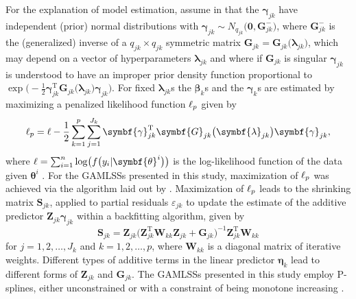 For the explanation of model estimation, assume in  that the \(\symbf{\gamma}_{j k}\) have independent (prior) normal distributions with \(\symbf{\gamma}_{j k} \sim N_{q_{j k}}\bigl(\symbf{0}, \symbf{G}_{j k}^-\bigr)\), where \(\symbf{G}_{j k}^-\) is the (generalized) inverse of a \(q_{j k} \times q_{j k}\) symmetric matrix \(\symbf{G}_{j k} = \symbf{G}_{j k}\bigl(\symbf{\lambda}_{j k}\bigr)\), which may depend on a vector of hyperparameters \(\symbf{\lambda}_{j k}\) and where if \(\symbf{G}_{j k}\) is singular \(\symbf{\gamma}_{j k}\) is understood to have an improper prior density function proportional to \(\exp\bigl(-\frac{1}{2} \symbf{\gamma}_{j k}^{\text{T}} \symbf{G}_{j k}\bigl(\symbf{\lambda}_{j k}\bigr) \symbf{\gamma}_{j k}\bigr)\).  For fixed \(\symbf{\lambda}_{j k}\)s the \(\symbf{\beta}_k\)s and the \(\symbf{\gamma}_k\)s are estimated by maximizing a penalized likelihood function \(\ell_p\) given by
\begin{equation}
  \label{eq:GAMLSSRigbyStasinopoulos2005PenalizedLikelihood}
  \loglikelihood_p = \loglikelihood - \frac{1}{2} \sum_{k = 1}^p \sum_{j = 1}^{J_k} \symbf{\gamma}_{j k}^{\text{T}} \symbf{G}_{j k}\bigl(\symbf{\lambda}_{j k}\bigr) \symbf{\gamma}_{j k},
\end{equation}
where \(\loglikelihood = \sum_{i = 1}^n \log\bigl(f\bigl(y_i | \symbf{\theta}^i\bigr)\bigr)\) is the log-likelihood function of the data given \(\symbf{\theta}^i\) \parencite{Rigby2005}.  For the GAMLSSs presented in this study, maximization of \(\ell_p\) was achieved via the algorithm laid out by \textcite{Rigby1996}.  Maximization of \(\ell_p\) leads to the shrinking matrix \(\symbf{S}_{j k}\), applied to partial residuals \(\varepsilon_{j k}\) to update the estimate of the additive predictor \(\symbf{Z}_{j k} \symbf{\gamma}_{j k}\) within a backfitting algorithm, given by
\begin{equation}
  \label{eq:GAMLSSRigbyStasinopoulos2005BackfittingAlgorithm}
  \symbf{S}_{j k} = \symbf{Z}_{j k} \bigl(\symbf{Z}_{j k}^{\text{T}} \symbf{W}_{k k} \symbf{Z}_{j k} + \symbf{G}_{j k}\bigr)^{-1} \symbf{Z}_{j k}^{\text{T}} \symbf{W}_{k k}
\end{equation}
for \(j = 1, 2, \ldots, J_k\) and \(k = 1, 2, \ldots, p\), where \(\symbf{W}_{k k}\) is a diagonal matrix of iterative weights.  Different types of additive terms in the linear predictor \(\symbf{\eta}_k\) lead to different forms of \(\symbf{Z}_{j k}\) and \(\symbf{G}_{j k}\).  The GAMLSSs presented in this study employ P-splines, either unconstrained \parencite{Eilers1996} or with a constraint of being monotone increasing \parencite{Bollaerts2006}.  %


